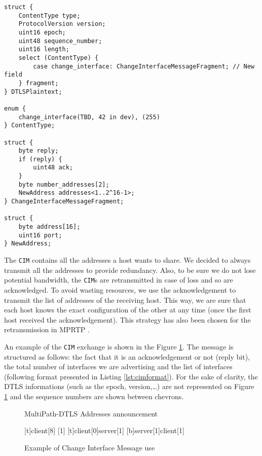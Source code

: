 \begin{lstlisting}[caption=Change Interface Message, label=lst:cimformat]
struct {
    ContentType type;
    ProtocolVersion version;
    uint16 epoch;
    uint48 sequence_number;
    uint16 length;
    select (ContentType) {
        case change_interface: ChangeInterfaceMessageFragment; // New field
    } fragment;
} DTLSPlaintext;

enum {
    change_interface(TBD, 42 in dev), (255)
} ContentType;

struct {
    byte reply;
    if (reply) {
        uint48 ack;
    }
    byte number_addresses[2];
    NewAddress addresses<1..2^16-1>;
} ChangeInterfaceMessageFragment;

struct {
    byte address[16];
    uint16 port;
} NewAddress;
\end{lstlisting}

The \texttt{CIM} contains all the addresses a host wants to share. We decided to always transmit all the addresses to provide redundancy. Also, to be sure we do not lose potential bandwidth, the \texttt{CIM}s are retransmitted in case of loss and so are acknowledged. To avoid wasting resources, we use the acknowledgement to transmit the list of addresses of the receiving host. This way, we are sure that each host knows the exact configuration of the other at any time (once the first host received the acknowledgement). This strategy has also been chosen for the retransmission in MPRTP \cite{singh-avtcore-mprtp}.

An example of the \texttt{CIM} exchange is shown in the Figure \ref{fig:CIMexchange}. The message is structured as follows: the fact that it is an acknowledgement or not (reply bit), the total number of interfaces we are advertising and the list of interfaces (following format presented in Listing \ref{lst:cimformat}). For the sake of clarity, the DTLS informations (such as the epoch, version,\dots) are not represented on Figure \ref{fig:CIMexchange} and the sequence numbers are shown between chevrons.

\begin{figure}[!ht]
\centering
\begin{msc}[r]{MultiPath-DTLS Addresses announcement}

\setlength{\instfootheight}{0em}
\setlength{\instheadheight}{0em}
\setlength{\instdist}{0.7\linewidth}
\setlength{\levelheight}{3em}


[t]{}{client}[8]
[1]
\nextlevel
{}[t]{client}[0]{server}[1]
\nextlevel
{}[b]{server}[1]{client}[1]
\nextlevel
\nextlevel

\end{msc}
\caption{Example of Change Interface Message use}
\label{fig:CIMexchange}
\end{figure}

